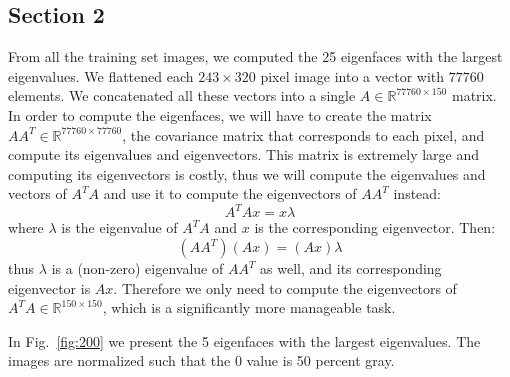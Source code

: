 \documentclass[a4paper]{iacas}
\begin{document}
\subsection{Section 2}

From all the training set images, we computed the 25 eigenfaces with the largest eigenvalues. We flattened each $243 \times 320$ pixel image into a vector with $77760$ elements. We concatenated all these vectors into a single $A \in \mathbb{R}^{77760 \times 150}$ matrix. In order to compute the eigenfaces, we will have to create the matrix $AA^T \in \mathbb{R}^{77760 \times 77760}$, the covariance matrix that corresponds to each pixel, and compute its eigenvalues and eigenvectors. This matrix is extremely large and computing its eigenvectors is costly, thus we will compute the eigenvalues and vectors of $A^TA$ and use it to compute the eigenvectors of $AA^T$ instead:
%
\begin{equation}
	A^TAx = x\lambda
\end{equation}
%
where $\lambda$ is the eigenvalue of $A^TA$ and $x$ is the corresponding eigenvector. Then:
%
\begin{equation}
	(AA^T)(Ax) = (Ax)\lambda
\end{equation}
%
thus $\lambda$ is a (non-zero) eigenvalue of $AA^T$ as well, and its corresponding eigenvector is $Ax$. Therefore we only need to compute the eigenvectors of $A^TA \in \mathbb{R}^{150 \times 150}$, which is a significantly more manageable task.

In Fig.~\ref{fig:200} we present the 5 eigenfaces with the largest eigenvalues. The images are normalized such that the 0 value is 50 percent gray.
\end{document}
